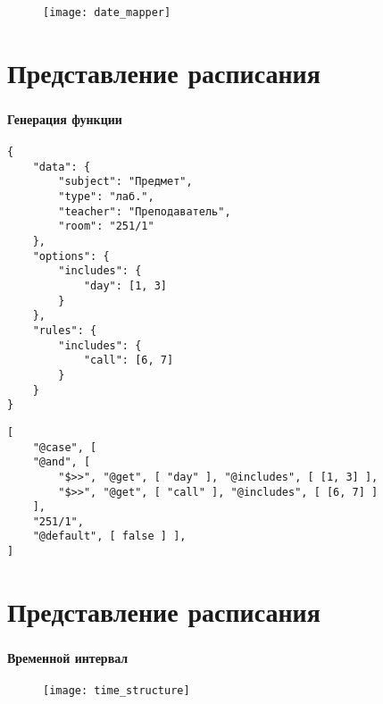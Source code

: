 \begin{frame}
\frametitle{\insertsection}

\begin{figure}
    \center
    \texttt{[image: date\_mapper]}
\end{figure}
\end{frame}


\section{Представление расписания}

\begin{frame}[fragile]
\frametitle{\insertsection}
\framesubtitle{Генерация функции}

    \begin{lstlisting}[basicstyle=\tiny]
{
    "data": {
        "subject": "Предмет",
        "type": "лаб.",
        "teacher": "Преподаватель",
        "room": "251/1"
    },
    "options": {
        "includes": {
            "day": [1, 3]
        }
    },
    "rules": {
        "includes": {
            "call": [6, 7]
        }
    }
}
    \end{lstlisting}
\endminipage\hfill
{}
    \begin{lstlisting}[basicstyle=\tiny]
[
    "@case", [
    "@and", [
        "$>>", "@get", [ "day" ], "@includes", [ [1, 3] ],
        "$>>", "@get", [ "call" ], "@includes", [ [6, 7] ]
    ],
    "251/1",
    "@default", [ false ] ],
]
    \end{lstlisting}
\endminipage

\end{frame}


\section{Представление расписания}

\begin{frame}[fragile]
\frametitle{\insertsection}
\framesubtitle{Временной интервал}

\begin{figure}
    \center
    \texttt{[image: time\_structure]}
\end{figure}
\end{frame}

